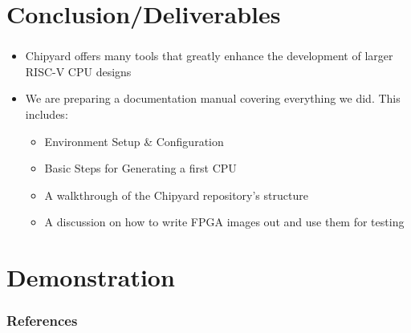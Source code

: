 \documentclass{eceday}
\begin{document}
\section{Conclusion/Deliverables}\label{sec:Conclusion_Deliverables}
\begin{frame}
  \frametitle{}
  \begin{itemize}
  \item Chipyard offers many tools that greatly enhance the development of larger RISC-V CPU designs
  \item We are preparing a documentation manual covering everything we did. This includes:
    \begin{itemize}
    \item Environment Setup \& Configuration
    \item Basic Steps for Generating a first CPU
    \item A walkthrough of the Chipyard repository's structure
    \item A discussion on how to write FPGA images out and use them for testing
    \end{itemize}
  \end{itemize}
\end{frame}

\section{Demonstration}\label{sec:Demonstration}
\begin{frame}
  \frametitle{}
\end{frame}

\begin{frame}
  \frametitle{References}
  \printbibliography[heading=bibintoc]{}
\end{frame}
\end{document}
